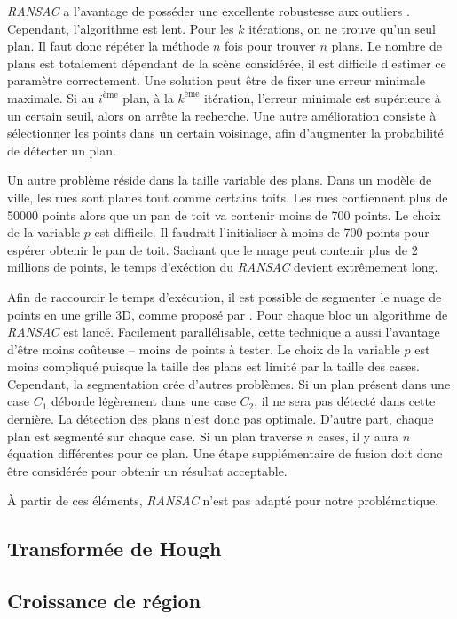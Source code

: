 \documentclass[12pt, twoside]{article}
\begin{document}
\textit{RANSAC} a l’avantage de posséder une excellente robustesse aux outliers \cite{RANSAC1}. Cependant, l’algorithme est lent. Pour les $k$ itérations, on ne trouve qu’un seul plan. Il faut donc répéter la méthode $n$ fois pour trouver $n$ plans. Le nombre de plans est totalement dépendant de la scène considérée, il est difficile d’estimer ce paramètre correctement. Une solution peut être de fixer une erreur minimale maximale. Si au $i^\text{ème}$ plan, à la $k^\text{ème}$ itération, l’erreur minimale est supérieure à un certain seuil, alors on arrête la recherche. Une autre amélioration consiste à sélectionner les points dans un certain voisinage, afin d’augmenter la probabilité de détecter un plan.

Un autre problème réside dans la taille variable des plans. Dans un modèle de ville, les rues sont planes tout comme certains toits. Les rues contiennent plus de 50000 points alors que un pan de toit va contenir moins de 700 points. Le choix de la variable $p$ est difficile. Il faudrait l'initialiser à moins de 700 points pour espérer obtenir le pan de toit. Sachant que le nuage peut contenir plus de 2 millions de points, le temps d'exéction du \textit{RANSAC} devient extrêmement long.

Afin de raccourcir le temps d'exécution, il est possible de segmenter le nuage de points en une grille 3D, comme proposé par \cite{RANSAC2}. Pour chaque bloc un algorithme de \textit{RANSAC} est lancé. Facilement parallélisable, cette technique a aussi l'avantage d'être moins coûteuse -- moins de points à tester. Le choix de la variable $p$ est moins compliqué puisque la taille des plans est limité par la taille des cases. Cependant, la segmentation crée d'autres problèmes. Si un plan présent dans une case $C_1$ déborde légèrement dans une case $C_2$, il ne sera pas détecté dans cette dernière. La détection des plans n'est donc pas optimale. D'autre part, chaque plan est segmenté sur chaque case. Si un plan traverse $n$ cases, il y aura $n$ équation différentes pour ce plan. Une étape supplémentaire de fusion doit donc être considérée pour obtenir un résultat acceptable.

À partir de ces éléments, \textit{RANSAC} n'est pas adapté pour notre problématique.

\subsection{Transformée de Hough}

\subsection{Croissance de région}
\end{document}
